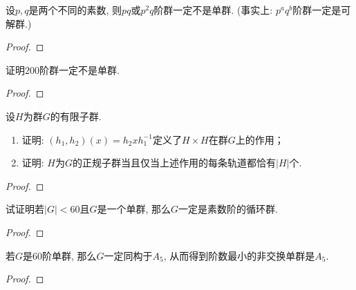 \begin{problem}
    设$p, q$是两个不同的素数, 则$pq$或$p^2q$阶群一定不是单群.
(事实上: $p^aq^b$阶群一定是可解群.)
\end{problem}

\begin{proof}
    
\end{proof}

\begin{problem}
    证明$200$阶群一定不是单群.
\end{problem}

\begin{proof}
    
\end{proof}

\begin{problem}
    设$H$为群$G$的有限子群.
\begin{enumerate}[(1)]
    \item 证明: $(h_1, h_2)(x) = h_2xh_1^{-1}$定义了$H \times H$在群$G$上的作用；
    \item 证明: $H$为$G$的正规子群当且仅当上述作用的每条轨道都恰有$|H|$个.
\end{enumerate}
\end{problem}

\begin{proof}
    
\end{proof}

\begin{problem}
    试证明若$|G| < 60$且$G$是一个单群, 那么$G$一定是素数阶的循环群.
\end{problem}

\begin{proof}
    
\end{proof}

\begin{problem}
    若$G$是$60$阶单群, 那么$G$一定同构于$A_5$,
从而得到阶数最小的非交换单群是$A_5$.
\end{problem}

\begin{proof}
    
\end{proof}